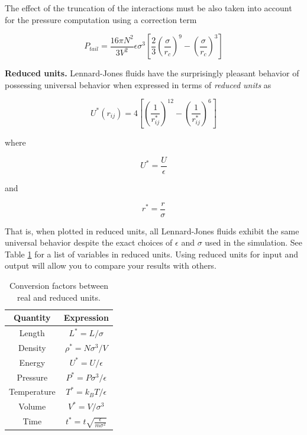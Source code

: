 \documentclass[aip,jcp,preprint,superscriptaddress,floatfix]{revtex4-1}
\begin{document}
The effect of the truncation of the interactions must be also taken into account for the pressure
computation using a correction term

\begin{equation}
        P_{tail} = \frac{16 \pi N^2}{3 V^2} \epsilon \sigma^3
        \left[\frac{2}{3} \left(\frac{\sigma}{r_c} \right)^9 
        - \left(\frac{\sigma}{r_c} \right)^3 \right]
\end{equation}




\textbf{Reduced units.}
Lennard-Jones fluids have the surprisingly pleasant behavior of possessing universal behavior when expressed in terms of \emph{reduced units} as

\begin{equation}
	U^*\left(r_{ij} \right) = 4 \left[\left(\frac{1}{r^*_{ij}}\right)^{12} -\left(\frac{1}{r^*_{ij}}\right)^{6} \right]
\end{equation}

where 

\begin{equation}
	U^* = \frac{U}{\epsilon}
\end{equation}

and 

\begin{equation}
	r^* = \frac{r}{\sigma}
\end{equation}

That is, when plotted in reduced units, all Lennard-Jones fluids exhibit the same universal behavior despite the exact choices of $\epsilon$ and $\sigma$ used in the simulation. See Table \ref{table:reducedUnits} for a list
of variables in reduced units.
Using reduced units for input and output will allow you to compare your results with others.

\begin{table}[t]
\centering
 \begin{tabular}{|c c|} 
 \hline
 Quantity & Expression \\ [0.5ex] 
 \hline\hline
 Length &  $L^*=L / \sigma$   \\ 
 Density &  $\rho^* = N \sigma^3 / V$   \\
 Energy &  $U^* = U / \epsilon$   \\
 Pressure &  $P^* = P \sigma^3 / \epsilon$   \\
 Temperature & $T^* = k_B T / \epsilon$ \\
 Volume & $V^* = V / \sigma^3$ \\
 Time & $t^* = t \sqrt{\frac{\epsilon}{m \sigma^2}}$ \\
 \hline
 \end{tabular}
 \caption{Conversion factors between real and reduced units.}
 \label{table:reducedUnits}
\end{table}
\end{document}
